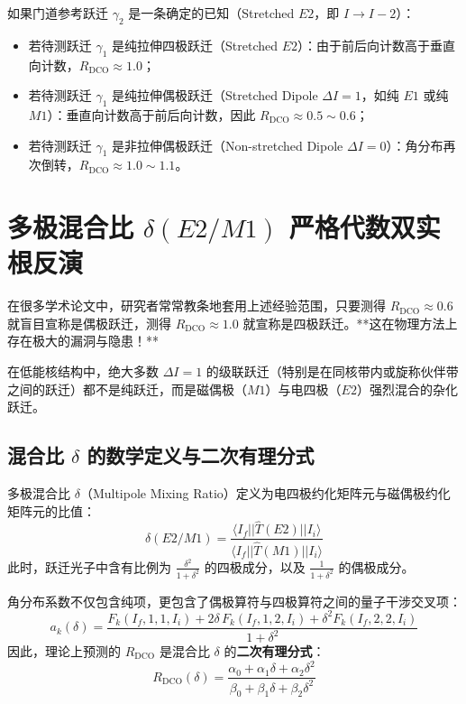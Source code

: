 如果门道参考跃迁 $\gamma_2$ 是一条确定的已知（Stretched $E2$，即 $I \to I-2$）：
\begin{itemize}
    \item 若待测跃迁 $\gamma_1$ 是纯拉伸四极跃迁（Stretched $E2$）：由于前后向计数高于垂直向计数，$R_{\text{DCO}} \approx 1.0$；
    \item 若待测跃迁 $\gamma_1$ 是纯拉伸偶极跃迁（Stretched Dipole $\Delta I = 1$，如纯 $E1$ 或纯 $M1$）：垂直向计数高于前后向计数，因此 $R_{\text{DCO}} \approx 0.5 \sim 0.6$；
    \item 若待测跃迁 $\gamma_1$ 是非拉伸偶极跃迁（Non-stretched Dipole $\Delta I = 0$）：角分布再次倒转，$R_{\text{DCO}} \approx 1.0 \sim 1.1$。
\end{itemize}

\section{多极混合比 $\delta(E2/M1)$ 严格代数双实根反演}
\label{sec:mixing_ratio_dual_root}

在很多学术论文中，研究者常常教条地套用上述经验范围，只要测得 $R_{\text{DCO}} \approx 0.6$ 就盲目宣称是偶极跃迁，测得 $R_{\text{DCO}} \approx 1.0$ 就宣称是四极跃迁。**这在物理方法上存在极大的漏洞与隐患！**

在低能核结构中，绝大多数 $\Delta I = 1$ 的级联跃迁（特别是在同核带内或旋称伙伴带之间的跃迁）都不是纯跃迁，而是磁偶极（$M1$）与电四极（$E2$）强烈混合的杂化跃迁。

\subsection{混合比 $\delta$ 的数学定义与二次有理分式}

多极混合比 $\delta$（Multipole Mixing Ratio）定义为电四极约化矩阵元与磁偶极约化矩阵元的比值：
\begin{equation}
    \delta(E2/M1) = \frac{\langle I_f || \hat{T}(E2) || I_i \rangle}{\langle I_f || \hat{T}(M1) || I_i \rangle}
    \label{eq:mixing_ratio_def}
\end{equation}
此时，跃迁光子中含有比例为 $\frac{\delta^2}{1 + \delta^2}$ 的四极成分，以及 $\frac{1}{1 + \delta^2}$ 的偶极成分。

角分布系数不仅包含纯项，更包含了偶极算符与四极算符之间的量子干涉交叉项：
\begin{equation}
    a_k(\delta) = \frac{F_k(I_f, 1, 1, I_i) + 2\delta \, F_k(I_f, 1, 2, I_i) + \delta^2 F_k(I_f, 2, 2, I_i)}{1 + \delta^2}
    \label{eq:ak_mixing}
\end{equation}
因此，理论上预测的 $R_{\text{DCO}}$ 是混合比 $\delta$ 的\textbf{二次有理分式}：
\begin{equation}
    R_{\text{DCO}}(\delta) = \frac{\alpha_0 + \alpha_1 \delta + \alpha_2 \delta^2}{\beta_0 + \beta_1 \delta + \beta_2 \delta^2}
    \label{eq:dco_quadratic}
\end{equation}

